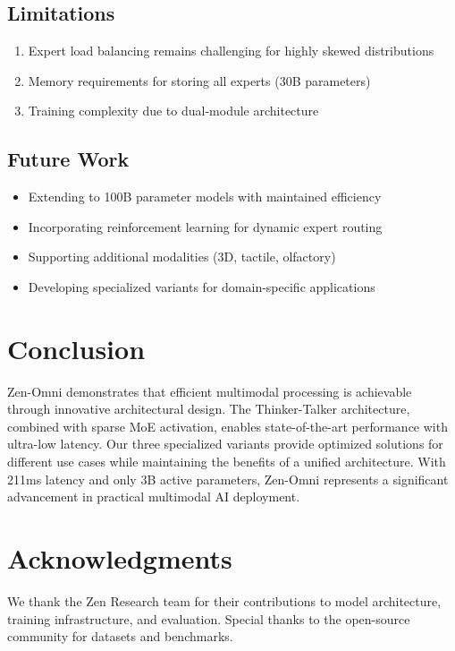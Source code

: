 \documentclass{article}
\begin{document}
\subsection{Limitations}

\begin{enumerate}
    \item Expert load balancing remains challenging for highly skewed distributions
    \item Memory requirements for storing all experts (30B parameters)
    \item Training complexity due to dual-module architecture
\end{enumerate}

\subsection{Future Work}

\begin{itemize}
    \item Extending to 100B parameter models with maintained efficiency
    \item Incorporating reinforcement learning for dynamic expert routing
    \item Supporting additional modalities (3D, tactile, olfactory)
    \item Developing specialized variants for domain-specific applications
\end{itemize}

\section{Conclusion}

Zen-Omni demonstrates that efficient multimodal processing is achievable through innovative architectural design. The Thinker-Talker architecture, combined with sparse MoE activation, enables state-of-the-art performance with ultra-low latency. Our three specialized variants provide optimized solutions for different use cases while maintaining the benefits of a unified architecture. With 211ms latency and only 3B active parameters, Zen-Omni represents a significant advancement in practical multimodal AI deployment.

\section*{Acknowledgments}

We thank the Zen Research team for their contributions to model architecture, training infrastructure, and evaluation. Special thanks to the open-source community for datasets and benchmarks.
\end{document}
